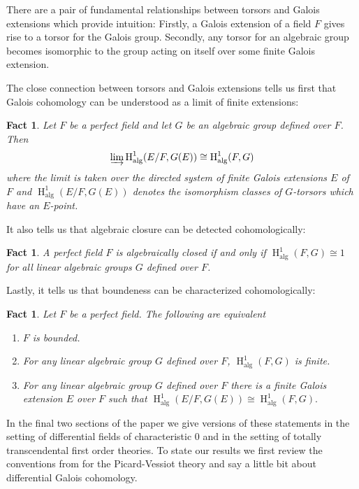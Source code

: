 \documentclass{amsart}
\newtheorem{fact}[theorem]{Fact}
\theoremstyle{definition}
\theoremstyle{remark}
\numberwithin{equation}{section}
\def \HH {\operatorname{H}}
\def \alg {\operatorname{alg}}
\begin{document}
There are a pair of fundamental relationships between torsors and Galois extensions which provide intuition: Firstly, a Galois extension of a field $F$ gives rise to a torsor for the Galois group. Secondly, any torsor for an algebraic group becomes isomorphic to the group acting on itself over some finite Galois extension. 

The close connection between torsors and Galois extensions tells us first that Galois cohomology can be understood as a limit of finite extensions:

\begin{fact}\relax\cite{Serre1979}
    Let $F$ be a perfect field and let $G$ be an algebraic group defined over $F$. Then $$\varinjlim \HH^1_{\alg}(E/F,G(E)) \cong \HH^1_{\alg}(F,G)$$ where the limit is taken over the directed system of finite Galois extensions $E$ of $F$ and $\HH^1_{\alg}(E/F,G(E))$ denotes the isomorphism classes of $G$-torsors which have an $E$-point. 
\end{fact} 

It also tells us that algebraic closure can be detected cohomologically:

\begin{fact}\cite{Serre1979}\relax
    A perfect field $F$ is algebraically closed if and only if $\HH^1_{\alg}(F,G) \cong 1$ for all linear algebraic groups $G$ defined over $F$. 
\end{fact}

Lastly, it tells us that boundeness can be characterized cohomologically: 

\begin{fact}\label{fact: alg bdd}\cite{Serre1979}
    Let $F$ be a perfect field. The following are equivalent
    
    \begin{enumerate}
        \item $F$ is bounded. 
        \item For any linear algebraic group $G$ defined over $F$, $\HH^1_{\alg}(F,G)$ is finite. 
        \item For any linear algebraic group $G$ defined over $F$ there is a finite Galois extension $E$ over $F$ such that $\HH^1_{\alg}(E/F,G(E))  \cong  \HH^1_{\alg}(F,G).$
    \end{enumerate}
\end{fact} 

In the final two sections of the paper we give versions of these statements in the setting of differential fields of characteristic $0$ and in the setting of  totally transcendental first order theories. To state our results we first review the conventions from \cite{meretzky2026galoistheoryautomorphismgroups} for the Picard-Vessiot theory and say a little bit about differential Galois cohomology.
\end{document}
